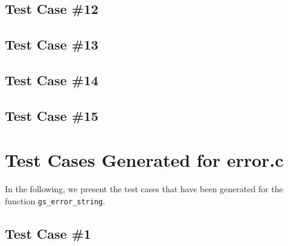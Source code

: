 \subsection{Test Case \#12}


\subsection{Test Case \#13}


\subsection{Test Case \#14}


\subsection{Test Case \#15}



\newpage
\section{Test Cases Generated for error.c}

In the following, we present the test cases that have been generated for the function \texttt{gs\_error\_string}.

\subsection{Test Case \#1}


